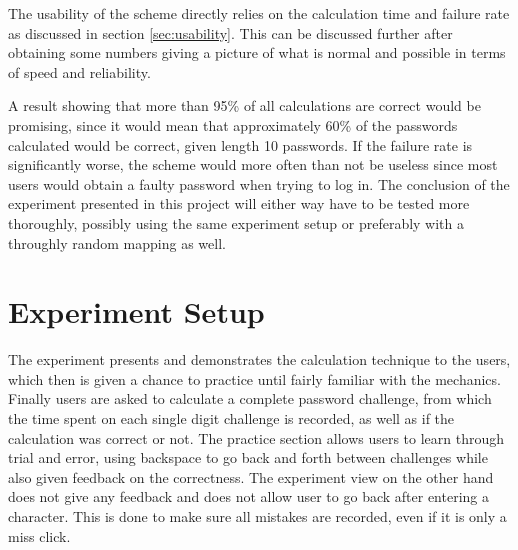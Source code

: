\par The usability of the scheme directly relies on the calculation time and failure rate as discussed in section \ref{sec:usability}. This can be discussed further after obtaining some numbers giving a picture of what is normal and possible in terms of speed and reliability.


\par A result showing that more than 95\% of all calculations are correct would be promising, since it would mean that approximately 60\% of the passwords calculated would be correct, given length 10 passwords. If the failure rate is significantly worse, the scheme would more often than not be useless since most users would obtain a faulty password when trying to log in. The conclusion of the experiment presented in this project will either way have to be tested more thoroughly, possibly using the same experiment setup or preferably with a throughly random mapping as well. 



\section{Experiment Setup}
The experiment presents and demonstrates the calculation technique to the users, which then is given a chance to practice until fairly familiar with the mechanics. Finally users are asked to calculate a complete password challenge, from which the time spent on each single digit challenge is recorded, as well as if the calculation was correct or not. The practice section allows users to learn through trial and error, using backspace to go back and forth between challenges while also given feedback on the correctness. The experiment view on the other hand does not give any feedback and does not allow user to go back after entering a character. This is done to make sure all mistakes are recorded, even if it is only a miss click. 
